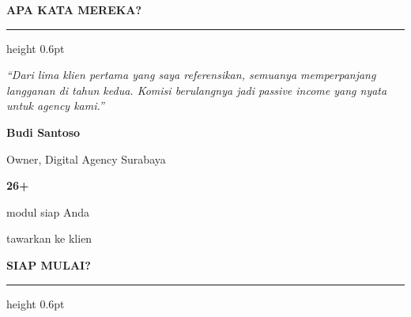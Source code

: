\documentclass[a4paper]{article}
\newcommand{\sectiontitle}[1]{%
    \vspace{10pt}%
    {\fontsize{13}{16}\selectfont\bfseries\color{BlueDark} #1}\par\vspace{3pt}%
    {\color{BluePrimary}\hrule height 0.6pt}\par\vspace{8pt}%
}
\begin{document}
\sectiontitle{APA KATA MEREKA?}

\noindent
\begin{minipage}[t]{0.485\textwidth}
    \colorbox{BlueBg}{%
        \begin{minipage}{\dimexpr\linewidth-2\fboxsep\relax}
            {\fontsize{9.5}{13}\selectfont\color{TextDark}\textit{``Dari lima klien pertama yang saya referensikan, semuanya memperpanjang langganan di tahun kedua. Komisi berulangnya jadi passive income yang nyata untuk agency kami.''}}\par\vspace{4pt}
            {\fontsize{8.5}{11}\selectfont\bfseries\color{BluePrimary} Budi Santoso}\par
            {\fontsize{8}{10}\selectfont\color{TextLight} Owner, Digital Agency Surabaya}
        \end{minipage}}
\end{minipage}%
\hfill
\begin{minipage}[t]{0.485\textwidth}
    \colorbox{BlueBg}{%
        \begin{minipage}{\dimexpr\linewidth-2\fboxsep\relax}
            \begin{center}
                {\fontsize{20}{24}\selectfont\bfseries\color{BluePrimary} 26+}\par
                {\fontsize{9.5}{12}\selectfont\color{TextDark} modul siap Anda}\par
                {\fontsize{9.5}{12}\selectfont\color{TextDark} tawarkan ke klien}
            \end{center}
        \end{minipage}}
\end{minipage}

\sectiontitle{SIAP MULAI?}
\end{document}

